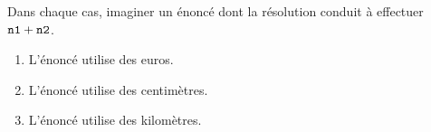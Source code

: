 \documentclass[exercice]{thedocument}%
\begin{document}
%
Dans chaque cas, imaginer un énoncé dont la résolution conduit à
effectuer $\<n1;+\<n2;$.
\begin{enumerate}
    \item L'énoncé utilise des euros.
    \item L'énoncé utilise des centimètres.
    \item L'énoncé utilise des kilomètres.
\end{enumerate}
\end{document}

